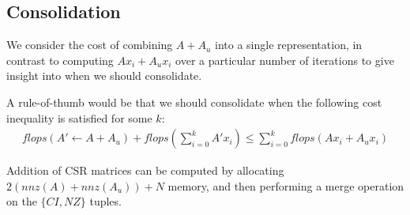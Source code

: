 \documentclass[11pt]{article}
\begin{document}
\subsection{Consolidation}
We consider the cost of combining $A+A_u$ into a single representation, in contrast to computing $Ax_i + A_ux_i$ over a particular number of iterations to give insight into when we should consolidate. 

A rule-of-thumb would be that we should consolidate when the following cost inequality is satisfied for some $k$: \begin{align} flops(A'\gets A + A_u) + flops(\sum_{i=0}^k A'x_i) \leq \sum_{i=0}^k flops(Ax_i + A_ux_i)\end{align}

Addition of CSR matrices can be computed by allocating $2(nnz(A)+nnz(A_u)) + N$ memory, and then performing a merge operation on the $\{CI,NZ\}$ tuples.  






\end{document}
